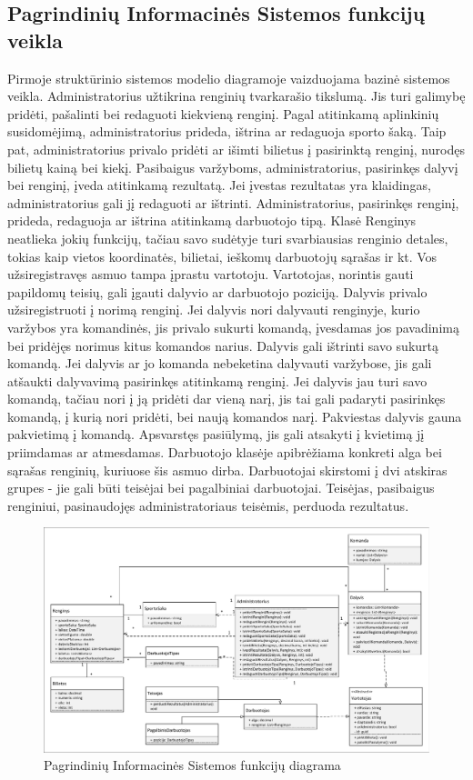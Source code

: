 \documentclass{VUMIFPSkursinis}
\begin{document}
		\subsection*{Pagrindinių Informacinės Sistemos funkcijų veikla}
		Pirmoje struktūrinio sistemos modelio diagramoje vaizduojama bazinė sistemos veikla.
		Administratorius užtikrina renginių tvarkarašio tikslumą.
		Jis turi galimybę pridėti, pašalinti bei redaguoti kiekvieną renginį.
		Pagal atitinkamą aplinkinių susidomėjimą, administratorius prideda, ištrina ar redaguoja sporto šaką.
		Taip pat, administratorius privalo pridėti ar išimti bilietus į pasirinktą renginį, nurodęs bilietų kainą bei kiekį.
		Pasibaigus varžyboms, administratorius, pasirinkęs dalyvį bei renginį, įveda atitinkamą rezultatą.
		Jei įvestas rezultatas yra klaidingas, administratorius gali jį redaguoti ar ištrinti.
		Administratorius, pasirinkęs renginį, prideda, redaguoja ar ištrina atitinkamą darbuotojo tipą.
		Klasė Renginys neatlieka jokių funkcijų, tačiau savo sudėtyje turi svarbiausias renginio detales, tokias kaip vietos koordinatės, bilietai, ieškomų darbuotojų sąrašas ir kt.
		Vos užsiregistravęs asmuo tampa įprastu vartotoju.
		Vartotojas, norintis gauti papildomų teisių, gali įgauti dalyvio ar darbuotojo poziciją.
		Dalyvis privalo užsiregistruoti į norimą renginį.
		Jei dalyvis nori dalyvauti renginyje, kurio varžybos yra komandinės, jis privalo sukurti komandą, įvesdamas jos pavadinimą bei pridėjęs norimus kitus komandos narius.
		Dalyvis gali ištrinti savo sukurtą komandą.
		Jei dalyvis ar jo komanda nebeketina dalyvauti varžybose, jis gali atšaukti dalyvavimą pasirinkęs atitinkamą renginį.
		Jei dalyvis jau turi savo komandą, tačiau nori į ją pridėti dar vieną narį, jis tai gali padaryti pasirinkęs komandą, į kurią nori pridėti, bei naują komandos narį.
		Pakviestas dalyvis gauna pakvietimą į komandą.
		Apsvarstęs pasiūlymą, jis gali atsakyti į kvietimą jį priimdamas ar atmesdamas.
		Darbuotojo klasėje apibrėžiama konkreti alga bei sąrašas renginių, kuriuose šis asmuo dirba.
		Darbuotojai skirstomi į dvi atskiras grupes - jie gali būti teisėjai bei pagalbiniai darbuotojai.
		Teisėjas, pasibaigus renginiui, pasinaudojęs administratoriaus teisėmis, perduoda rezultatus.
		
		
		\begin{figure}[H]
			\centering
			\includegraphics[width=\textwidth]{img/KlasiuDiagrama1}
			\caption{Pagrindinių Informacinės Sistemos funkcijų diagrama}
			\label{fig:PagrindiniuInformacinėsSistemosFunkcijųDiagrama}
		\end{figure}
\end{document}

